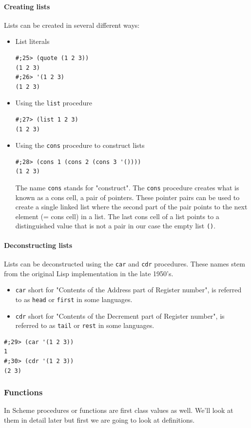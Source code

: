 \documentclass[12pt,a4paper,english,twoside]{article}
\begin{document}
\paragraph{Creating lists}
Lists can be created in several different ways:
\begin{itemize}
\item List literals \begin{lstlisting}
#;25> (quote (1 2 3))
(1 2 3)
#;26> '(1 2 3)
(1 2 3)
\end{lstlisting}
\item Using the \texttt{list} procedure
\begin{lstlisting}
#;27> (list 1 2 3)
(1 2 3)
\end{lstlisting}
\item Using the \texttt{cons} procedure to construct lists  \begin{lstlisting}
#;28> (cons 1 (cons 2 (cons 3 '())))
(1 2 3)
\end{lstlisting}
The name \texttt{cons} stands for "construct". The \texttt{cons} procedure 
creates what is known as a cons cell, a pair of pointers. These pointer pairs 
can be used to create a single linked list where the second part of the pair 
points to the next element (= cons cell) in a list. The last cons cell of a 
list points to a distinguished value that is not a pair in our case the empty 
list \texttt{()}.  \end{itemize}
\paragraph{Deconstructing lists}
Lists can be deconstructed using the \texttt{car} and \texttt{cdr} procedures. 
These names stem from the original Lisp implementation in the late 1950's.  
\begin{itemize}
\item \texttt{car} short for "Contents of the Address part of Register number",
  is referred to as \texttt{head} or \texttt{first} in some languages.
\item \texttt{cdr} short for "Contents of the Decrement part of Register 
  number", is referred to as \texttt{tail} or \texttt{rest} in some languages.
\end{itemize} \begin{lstlisting}
#;29> (car '(1 2 3))
1
#;30> (cdr '(1 2 3))
(2 3)
\end{lstlisting}
\subsubsection{Functions}
In Scheme procedures or functions are first class values as well. We'll look at 
them in detail later but first we are going to look at definitions.
\end{document}
